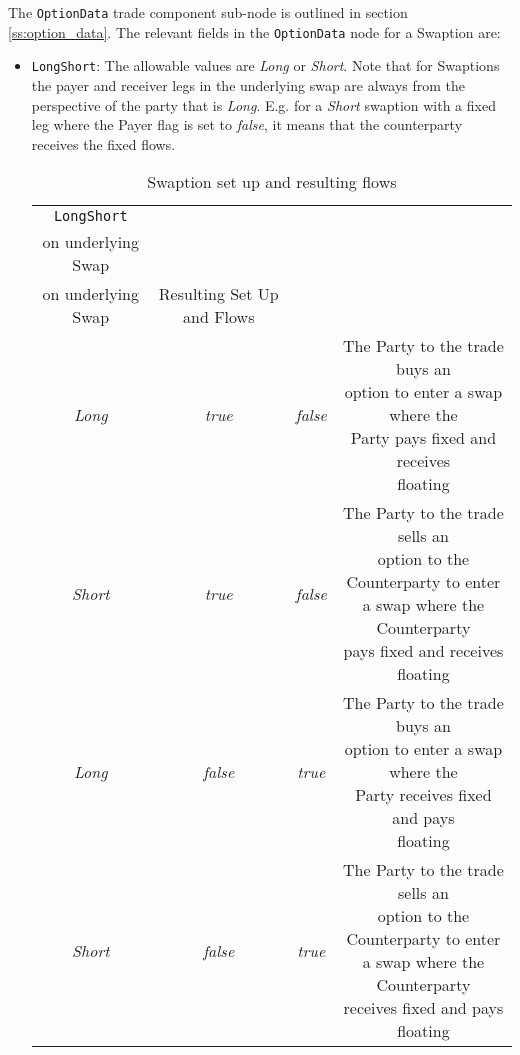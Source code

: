 The \lstinline!OptionData! trade component sub-node is outlined in section \ref{ss:option_data}. 
The relevant fields in the \lstinline!OptionData! node for a Swaption are:

\begin{itemize}
\item \lstinline!LongShort!: The allowable values are \emph{Long} or \emph{Short}. Note that for Swaptions the payer and receiver legs in the underlying swap are always from the perspective of the party that is \emph{Long}. E.g. for a \emph{Short} swaption with a fixed leg where the Payer flag is set to \emph{false}, it means that the counterparty receives the fixed flows.  

\begin{table}[H]
\centering
\begin{tabular} {| c | c | c | c |}    \hline
        \lstinline!LongShort! & \makecell{\lstinline!Payer! for Fixed leg \\ on underlying Swap} & \makecell{\lstinline!Payer! for Floating leg \\ on underlying Swap} & Resulting Set Up and Flows \\  \hline
   \emph{Long} & \emph{true} & \emph{false} & \makecell[l]{The Party to the trade buys an \\ option to enter a swap where the \\ Party pays fixed and receives \\ floating}  \\  \hline
    \emph{Short} & \emph{true} & \emph{false} & \makecell[l]{The Party to the trade sells an \\ option to the Counterparty to enter \\ a swap where the Counterparty \\ pays fixed and receives floating}  \\  \hline
    \emph{Long} & \emph{false} & \emph{true} & \makecell[l]{The Party to the trade buys an \\ option to enter a swap where the \\ Party receives fixed and pays \\ floating}  \\  \hline
    \emph{Short} & \emph{false} & \emph{true} & \makecell[l]{The Party to the trade sells an \\ option to the Counterparty to enter \\ a swap where the Counterparty \\ receives fixed and pays floating}  \\  \hline        
  \end{tabular}
  \caption{Swaption set up and resulting flows}
  \label{tab:swaption_setup}
\end{table}


\end{itemize}
